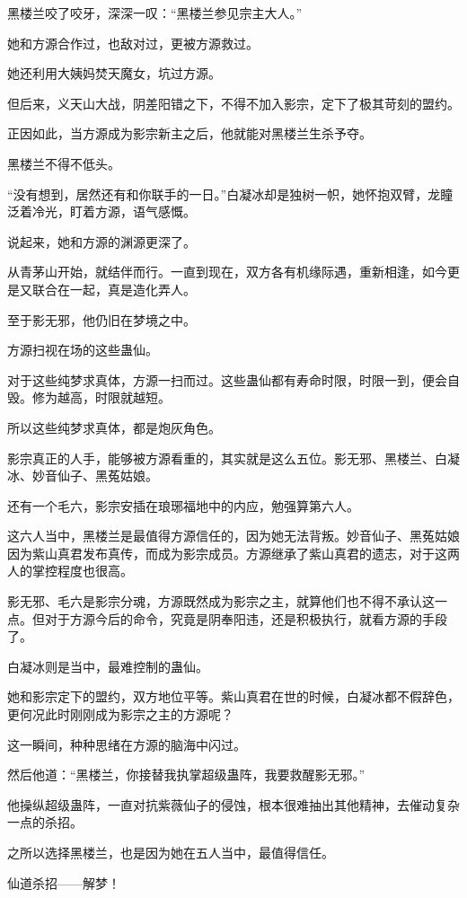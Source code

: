 \begin{this_body}
黑楼兰咬了咬牙，深深一叹：“黑楼兰参见宗主大人。”

她和方源合作过，也敌对过，更被方源救过。

她还利用大姨妈焚天魔女，坑过方源。

但后来，义天山大战，阴差阳错之下，不得不加入影宗，定下了极其苛刻的盟约。

正因如此，当方源成为影宗新主之后，他就能对黑楼兰生杀予夺。

黑楼兰不得不低头。

“没有想到，居然还有和你联手的一日。”白凝冰却是独树一帜，她怀抱双臂，龙瞳泛着冷光，盯着方源，语气感慨。

说起来，她和方源的渊源更深了。

从青茅山开始，就结伴而行。一直到现在，双方各有机缘际遇，重新相逢，如今更是又联合在一起，真是造化弄人。

至于影无邪，他仍旧在梦境之中。

方源扫视在场的这些蛊仙。

对于这些纯梦求真体，方源一扫而过。这些蛊仙都有寿命时限，时限一到，便会自毁。修为越高，时限就越短。

所以这些纯梦求真体，都是炮灰角色。

影宗真正的人手，能够被方源看重的，其实就是这么五位。影无邪、黑楼兰、白凝冰、妙音仙子、黑菟姑娘。

还有一个毛六，影宗安插在琅琊福地中的内应，勉强算第六人。

这六人当中，黑楼兰是最值得方源信任的，因为她无法背叛。妙音仙子、黑菟姑娘因为紫山真君发布真传，而成为影宗成员。方源继承了紫山真君的遗志，对于这两人的掌控程度也很高。

影无邪、毛六是影宗分魂，方源既然成为影宗之主，就算他们也不得不承认这一点。但对于方源今后的命令，究竟是阴奉阳违，还是积极执行，就看方源的手段了。

白凝冰则是当中，最难控制的蛊仙。

她和影宗定下的盟约，双方地位平等。紫山真君在世的时候，白凝冰都不假辞色，更何况此时刚刚成为影宗之主的方源呢？

这一瞬间，种种思绪在方源的脑海中闪过。

然后他道：“黑楼兰，你接替我执掌超级蛊阵，我要救醒影无邪。”

他操纵超级蛊阵，一直对抗紫薇仙子的侵蚀，根本很难抽出其他精神，去催动复杂一点的杀招。

之所以选择黑楼兰，也是因为她在五人当中，最值得信任。

仙道杀招——解梦！


\end{this_body}
